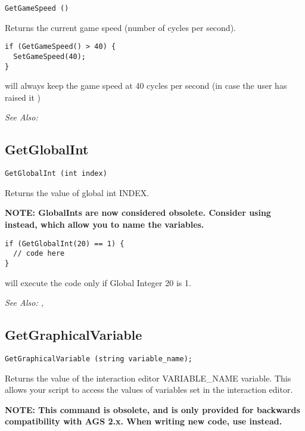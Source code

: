 \begin{verbatim}
GetGameSpeed ()
\end{verbatim}
Returns the current game speed (number of cycles per second).

\begin{verbatim}
if (GetGameSpeed() > 40) {
  SetGameSpeed(40);
}
\end{verbatim}
will always keep the game speed at 40 cycles per second (in case the user has raised it )

\it{See Also:} 


\subsection{GetGlobalInt}\label{GetGlobalInt}%

\begin{verbatim}
GetGlobalInt (int index)
\end{verbatim}
Returns the value of global int INDEX.

\bf{NOTE:} GlobalInts are now considered obsolete. Consider using
 instead, which allow you to name
the variables.

\begin{verbatim}
if (GetGlobalInt(20) == 1) {
  // code here
}
\end{verbatim}
will execute the code only if Global Integer 20 is 1.

\it{See Also:} , 



\subsection{GetGraphicalVariable}\label{GetGraphicalVariable}%

\begin{verbatim}
GetGraphicalVariable (string variable_name);
\end{verbatim}
Returns the value of the interaction editor VARIABLE_NAME variable. This allows your
script to access the values of variables set in the interaction editor.

\bf{NOTE:} This command is obsolete, and is only provided for backwards compatibility
with AGS 2.x. When writing new code, use 
instead.

